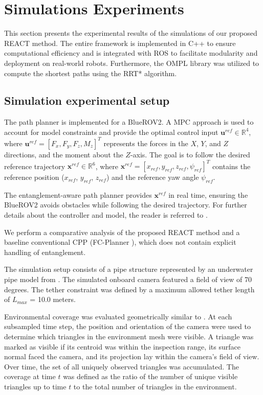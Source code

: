 \section{Simulations Experiments}
\label{sec:simulationexperiments}


This section presents the experimental results of the simulations of our proposed \ac{REACT} method. The entire framework is implemented in C++ to ensure computational efficiency and is integrated with ROS to facilitate modularity and deployment on real-world robots. Furthermore, the \ac{OMPL} library \cite{ompl} was utilized to compute the shortest paths using the RRT* algorithm.  


\subsection{Simulation experimental setup }
The path planner is implemented for a BlueROV2. A \ac{MPC} approach is used to account for model constraints and provide the optimal control input $\mathbf{u}^{ref} \in \mathbb{R}^4$, where $\mathbf{u}^{ref} = [F_x, F_y, F_z, M_z]^T$ represents the forces in the $X$, $Y$, and $Z$ directions, and the moment about the $Z$-axis. The goal is to follow the desired reference trajectory $\mathbf{x}^{ref} \in \mathbb{R}^6$, where $\mathbf{x}^{ref} = [x_{ref}, y_{ref}, z_{ref}, \psi_{ref}]^T$ contains the reference position ($x_{ref}$, $y_{ref}$, $z_{ref}$) and the reference yaw angle $\psi_{ref}$.

The entanglement-aware path planner provides $\mathbf{x}^{ref}$ in real time, ensuring the BlueROV2 avoids obstacles while following the desired trajectory. For further details about the controller and model, the reader is referred to \cite{amergp}.

We perform a comparative analysis of the proposed \ac{REACT} method and a baseline conventional \ac{CPP} (FC-Planner \cite{feng2024fc}), which does not contain explicit handling of entanglement. 

The simulation setup consists of a pipe structure represented by an underwater pipe model from \cite{feng2024fc}. The simulated onboard camera featured a field of view of 70 degrees. The tether constraint was defined by a maximum allowed tether length of $L_{max}$ = 10.0 meters.

Environmental coverage was evaluated geometrically similar to \cite{amer2023visual}. At each subsampled time step, the position and orientation of the camera were used to determine which triangles in the environment mesh were visible. A triangle was marked as visible if its centroid was within the inspection range, its surface normal faced the camera, and its projection lay within the camera's field of view. Over time, the set of all uniquely observed triangles was accumulated. The coverage at time $t$ was defined as the ratio of the number of unique visible triangles up to time $t$ to the total number of triangles in the environment.


